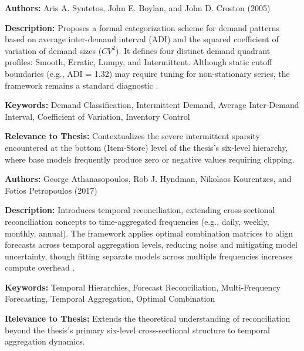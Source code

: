 {

	\textbf{Authors:}
	Aris A. Syntetos, John E. Boylan, and John D. Croston (2005)

	\textbf{Description:}
	Proposes a formal categorization scheme for demand patterns based on average inter-demand interval (ADI) and the squared coefficient of variation of demand sizes (\(CV^2\)). It defines four distinct demand quadrant profiles: Smooth, Erratic, Lumpy, and Intermittent. Although static cutoff boundaries (e.g., ADI = 1.32) may require tuning for non-stationary series, the framework remains a standard diagnostic \autocite{Syntetos:2005}.

	\textbf{Keywords:}
	Demand Classification, Intermittent Demand, Average Inter-Demand Interval, Coefficient of Variation, Inventory Control

	\textbf{Relevance to Thesis:}
	Contextualizes the severe intermittent sparsity encountered at the bottom (Item-Store) level of the thesis's six-level hierarchy, where base models frequently produce zero or negative values requiring clipping.

}


{

	\textbf{Authors:}
	George Athanasopoulos, Rob J. Hyndman, Nikolaos Kourentzes, and Fotios Petropoulos (2017)

	\textbf{Description:}
	Introduces temporal reconciliation, extending cross-sectional reconciliation concepts to time-aggregated frequencies (e.g., daily, weekly, monthly, annual). The framework applies optimal combination matrices to align forecasts across temporal aggregation levels, reducing noise and mitigating model uncertainty, though fitting separate models across multiple frequencies increases compute overhead \autocite{Athanasopoulos:2017}.

	\textbf{Keywords:}
	Temporal Hierarchies, Forecast Reconciliation, Multi-Frequency Forecasting, Temporal Aggregation, Optimal Combination

	\textbf{Relevance to Thesis:}
	Extends the theoretical understanding of reconciliation beyond the thesis's primary six-level cross-sectional structure to temporal aggregation dynamics.

}

